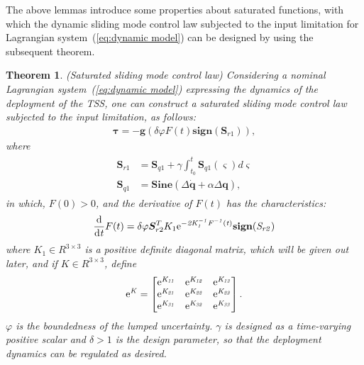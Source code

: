 \documentclass[3p]{elsarticle}
\theoremstyle{plain}
\newtheorem{mythm}{Theorem}
\theoremstyle{remark}
\begin{document}
The above lemmas introduce some properties about saturated functions, with which the dynamic sliding mode control law subjected to the input limitation for Lagrangian system~(\ref{eq:dynamic model}) can be designed by using the subsequent theorem.
\begin{mythm}\label{thm:1}(Saturated sliding mode control law)
Considering a nominal Lagrangian system~(\ref{eq:dynamic model}) expressing the dynamics of the deployment of the TSS, one can construct a saturated sliding mode control law subjected to the input limitation, as follows:
\begin{align}
\bm\tau = -\bm{g}(\delta\varphi F(t) \mathbf{sign}(\bm S_{r1})),\label{eq:slider control}
\end{align}
where
\begin{align}
\begin{split}
\bm S_{r1} &= \bm S_{q1}+\gamma\int^t_{t_0}\bm S_{q1}(\varsigma) d\varsigma\\
\bm S_{q1} &= \mathbf{Sine}(\Delta \dot {\bm q}+\alpha\Delta\bm q),\label{eq:sq1}
\end{split}
\end{align}
in which, $F(0)>0$, and the derivative of $F(t)$ has the characteristics:
\begin{align}
\frac{\rm{d}}{\rm{d}\it{t}}F(t) = \delta\varphi \bm S_{r2}^T K_1\rm{e}\it{^{-2K_1^{-1}F^{-1}(t)}}\mathbf{sign}(\bm S_{r2})
\end{align}
where $K_1\in R^{3\times 3}$ is a positive definite diagonal matrix, which will be given out later, and if $K\in R^{3\times 3}$, define
\begin{align}
\rm{e}\it{^K}=
\begin{bmatrix}
\rm{e}\it{^{K_{11}}}&\rm{e}\it{^{K_{12}}}&\rm{e}\it{^{K_{13}}}\\
\rm{e}\it{^{K_{21}}}&\rm{e}\it{^{K_{22}}}&\rm{e}\it{^{K_{23}}}\\
\rm{e}\it{^{K_{31}}}&\rm{e}\it{^{K_{32}}}&\rm{e}\it{^{K_{33}}}
\end{bmatrix}.
\end{align}
$\varphi$ is the boundedness of the lumped uncertainty. $\gamma$ is designed as a time-varying positive scalar and $\delta>1$ is the design parameter, so that the deployment dynamics can be regulated as desired.
\end{mythm}
\end{document}
